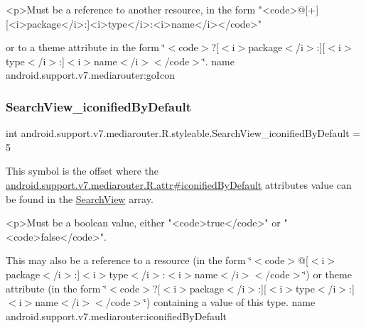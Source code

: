 \begin{DoxyVerb}      <p>Must be a reference to another resource, in the form "<code>@[+][<i>package</i>:]<i>type</i>:<i>name</i></code>"
\end{DoxyVerb}
 or to a theme attribute in the form \char`\"{}$<$code$>$?\mbox{[}$<$i$>$package$<$/i$>$\+:\mbox{]}\mbox{[}$<$i$>$type$<$/i$>$\+:\mbox{]}$<$i$>$name$<$/i$>$$<$/code$>$\char`\"{}.  name android.\+support.\+v7.\+mediarouter\+:go\+Icon \mbox{\label{classandroid_1_1support_1_1v7_1_1mediarouter_1_1R_1_1styleable_a8d919271ebc1a35d5b4d097c8a4fef08}} 
\subsubsection{\texorpdfstring{Search\+View\+\_\+iconified\+By\+Default}{SearchView\_iconifiedByDefault}}
{\footnotesize\ttfamily int android.\+support.\+v7.\+mediarouter.\+R.\+styleable.\+Search\+View\+\_\+iconified\+By\+Default = 5\hspace{0.3cm}{\ttfamily [static]}}

This symbol is the offset where the \hyperlink{classandroid_1_1support_1_1v7_1_1mediarouter_1_1R_1_1attr_a5691ffb921d3194a5b3e342ee2a6ecc6}{android.\+support.\+v7.\+mediarouter.\+R.\+attr\#iconified\+By\+Default} attribute\textquotesingle{}s value can be found in the \hyperlink{classandroid_1_1support_1_1v7_1_1mediarouter_1_1R_1_1styleable_a5573e3195bf93122a37c69394418c7d7}{Search\+View} array.

\begin{DoxyVerb}      <p>Must be a boolean value, either "<code>true</code>" or "<code>false</code>".
\end{DoxyVerb}
 

This may also be a reference to a resource (in the form \char`\"{}$<$code$>$@\mbox{[}$<$i$>$package$<$/i$>$\+:\mbox{]}$<$i$>$type$<$/i$>$\+:$<$i$>$name$<$/i$>$$<$/code$>$\char`\"{}) or theme attribute (in the form \char`\"{}$<$code$>$?\mbox{[}$<$i$>$package$<$/i$>$\+:\mbox{]}\mbox{[}$<$i$>$type$<$/i$>$\+:\mbox{]}$<$i$>$name$<$/i$>$$<$/code$>$\char`\"{}) containing a value of this type.  name android.\+support.\+v7.\+mediarouter\+:iconified\+By\+Default \mbox{\label{classandroid_1_1support_1_1v7_1_1mediarouter_1_1R_1_1styleable_a0261fec701a8d342dc4392b2612e4fdc}} 
